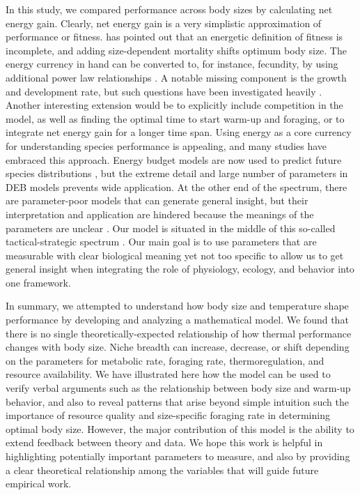 In this study, we compared performance across body sizes by calculating net energy gain.
Clearly, net energy gain is a very simplistic approximation of performance or fitness.
\citet{Kozlowski1996} has pointed out that an energetic definition of fitness is incomplete, and adding size-dependent mortality shifts optimum body size.
The energy currency in hand can be converted to, for instance, fecundity, by using additional power law relationships \citep{Kooijman2009}. %
A notable missing component is the growth and development rate, but such questions have been investigated heavily \citep{VandH1996, Kozlowski2004,Kooijman2009}.
Another interesting extension would be to explicitly include competition in the model, as well as finding the optimal time to start warm-up and foraging, or to integrate net energy gain for a longer time span.
Using energy as a core currency for understanding species performance is appealing, and many studies have embraced this approach.
Energy budget models are now used to predict future species distributions \citep[e.g.,][]{Buckley2008}, but the extreme detail and large number of parameters in DEB models \citep{Kooijman2009} prevents wide application.
At the other end of the spectrum, there are parameter-poor models that can generate general insight, but their interpretation and application are hindered because the meanings of the parameters are unclear \citep[e.g.,][]{Brown1993}.
Our model is situated in the middle of this so-called tactical-strategic spectrum \citet{Holling1966}.
Our main goal is to use parameters that are measurable with clear biological meaning yet not too specific to allow us to get general insight when integrating the role of physiology, ecology, and behavior into one framework.


In summary, we attempted to understand how body size and temperature shape performance by developing and analyzing a mathematical model.
We found that there is no single theoretically-expected relationship of how thermal performance changes with body size.
Niche breadth can increase, decrease, or shift depending on the parameters for metabolic rate, foraging rate, thermoregulation, and resource availability.
We have illustrated here how the model can be used to verify verbal arguments such as the relationship between body size and warm-up behavior, and also to reveal patterns that arise beyond simple intuition such the importance of resource quality and size-specific foraging rate in determining optimal body size.
However, the major contribution of this model is the ability to extend feedback between theory and data.
We hope this work is helpful in highlighting potentially important parameters to measure, and also by providing a clear theoretical relationship among the variables that will guide future empirical work.

